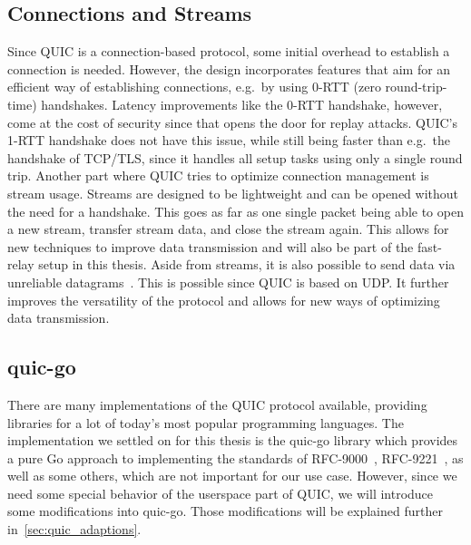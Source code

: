 \subsection{Connections and Streams}
Since QUIC is a connection-based protocol, some initial overhead to establish a connection is needed.
However, the design incorporates features that aim for an efficient way of establishing 
connections, e.g.\ by using 0-RTT (zero round-trip-time) handshakes. 
Latency improvements like the 0-RTT handshake, however, come at the cost of security since that opens 
the door for replay attacks.
QUIC's 1-RTT handshake does not have this issue, while still being faster
than e.g.\ the handshake of TCP/TLS, since it handles all setup tasks using only
a single round trip.
Another part where QUIC tries to optimize connection management is stream usage.
Streams are designed to be lightweight and can be opened without the need for a handshake.
This goes as far as one single packet being able to open a new stream, transfer stream data,
and close the stream again.
This allows for new techniques to improve data transmission and will also be part of the fast-relay 
setup in this thesis.
Aside from streams, it is also possible to send data via unreliable 
datagrams~\parencite{rfc-9221}.
This is possible since QUIC is based on UDP\@.
It further improves the versatility of the protocol and allows 
for new ways of optimizing data transmission.

\subsection{quic-go}
There are many implementations of the QUIC protocol available, providing libraries for a lot of 
today's most popular programming languages.
The implementation we settled on for this thesis is the quic-go library which provides a pure Go 
approach to implementing the standards of RFC-9000~\parencite{rfc-9000}, 
RFC-9221~\parencite{rfc-9221}, as well as some others, which are not 
important for our use case. 
However, since we need some special behavior of the userspace part of QUIC, we will introduce some 
modifications into quic-go.  
Those modifications will be explained further in~\autoref{sec:quic_adaptions}.

